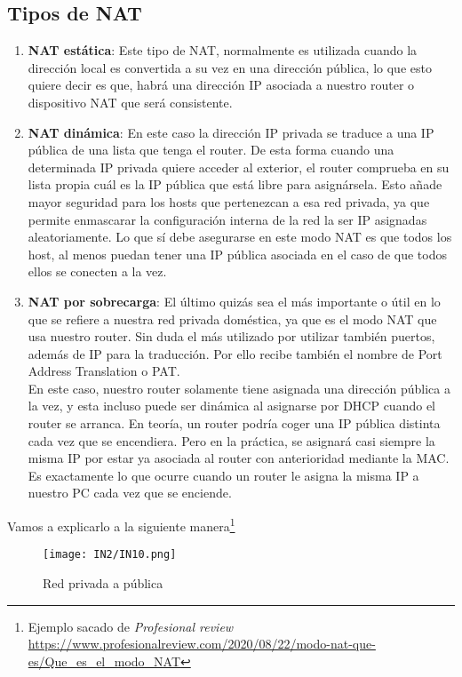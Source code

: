 \documentclass[
	12pt, %
	fleqn, %
	a4paper, %
	oneside, %
]{LegrandOrangeBook}
\begin{document}
\subsection{Tipos de NAT}
\begin{enumerate}
\item \textbf{NAT estática}: Este tipo de NAT, normalmente es utilizada cuando la dirección local es convertida a su vez en una dirección pública, lo que esto quiere decir es que, habrá una dirección IP asociada a nuestro router o dispositivo NAT que será consistente.
\item \textbf{NAT dinámica}: En este caso la dirección IP privada se traduce a una IP pública de una lista que tenga el router. De esta forma cuando una determinada IP privada quiere acceder al exterior, el router comprueba en su lista propia cuál es la IP pública que está libre para asignársela. Esto añade mayor seguridad para los hosts que pertenezcan a esa red privada, ya que permite enmascarar la configuración interna de la red la ser IP asignadas aleatoriamente. Lo que sí debe asegurarse en este modo NAT es que todos los host, al menos puedan tener una IP pública asociada en el caso de que todos ellos se conecten a la vez.
\item \textbf{NAT por sobrecarga}: El último quizás sea el más importante o útil en lo que se refiere a nuestra red privada doméstica, ya que es el modo NAT que usa nuestro router. Sin duda el más utilizado por utilizar también puertos, además de IP para la traducción. Por ello recibe también el nombre de Port Address Translation o PAT.\\
En este caso, nuestro router solamente tiene asignada una dirección pública a la vez, y esta incluso puede ser dinámica al asignarse por DHCP cuando el router se arranca. En teoría, un router podría coger una IP pública distinta cada vez que se encendiera. Pero en la práctica, se asignará casi siempre la misma IP por estar ya asociada al router con anterioridad mediante la MAC. Es exactamente lo que ocurre cuando un router le asigna la misma IP a nuestro PC cada vez que se enciende.
\end{enumerate}
Vamos a explicarlo a la siguiente manera\footnote{Ejemplo sacado de \textit{Profesional review} \url{https://www.profesionalreview.com/2020/08/22/modo-nat-que-es/Que\_es\_el\_modo\_NAT}}
\begin{figure}[H]
\centering
\texttt{[image: IN2/IN10.png]}
\caption{Red privada a pública}
\end{figure}
\end{document}

